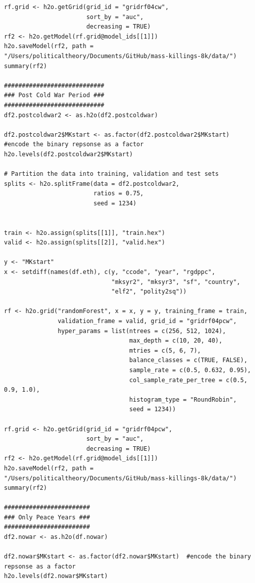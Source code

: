 \begin{verbatim}
rf.grid <- h2o.getGrid(grid_id = "gridrf04cw",
                       sort_by = "auc",
                       decreasing = TRUE)
rf2 <- h2o.getModel(rf.grid@model_ids[[1]])
h2o.saveModel(rf2, path = "/Users/politicaltheory/Documents/GitHub/mass-killings-8k/data/")
summary(rf2)

############################
### Post Cold War Period ###
############################
df2.postcoldwar2 <- as.h2o(df2.postcoldwar)

df2.postcoldwar2$MKstart <- as.factor(df2.postcoldwar2$MKstart)  #encode the binary repsonse as a factor
h2o.levels(df2.postcoldwar2$MKstart)

# Partition the data into training, validation and test sets
splits <- h2o.splitFrame(data = df2.postcoldwar2, 
                         ratios = 0.75,  
                         seed = 1234)  


train <- h2o.assign(splits[[1]], "train.hex")   
valid <- h2o.assign(splits[[2]], "valid.hex") 

y <- "MKstart"
x <- setdiff(names(df.eth), c(y, "ccode", "year", "rgdppc",
                              "mksyr2", "mksyr3", "sf", "country",
                              "elf2", "polity2sq")) 

rf <- h2o.grid("randomForest", x = x, y = y, training_frame = train, 
               validation_frame = valid, grid_id = "gridrf04pcw",
               hyper_params = list(ntrees = c(256, 512, 1024),
                                   max_depth = c(10, 20, 40),
                                   mtries = c(5, 6, 7),
                                   balance_classes = c(TRUE, FALSE),
                                   sample_rate = c(0.5, 0.632, 0.95),
                                   col_sample_rate_per_tree = c(0.5, 0.9, 1.0),
                                   histogram_type = "RoundRobin",
                                   seed = 1234)) 

rf.grid <- h2o.getGrid(grid_id = "gridrf04pcw",
                       sort_by = "auc",
                       decreasing = TRUE)
rf2 <- h2o.getModel(rf.grid@model_ids[[1]])
h2o.saveModel(rf2, path = "/Users/politicaltheory/Documents/GitHub/mass-killings-8k/data/")
summary(rf2)

########################
### Only Peace Years ###
########################
df2.nowar <- as.h2o(df.nowar)

df2.nowar$MKstart <- as.factor(df2.nowar$MKstart)  #encode the binary repsonse as a factor
h2o.levels(df2.nowar$MKstart)


\end{verbatim}
